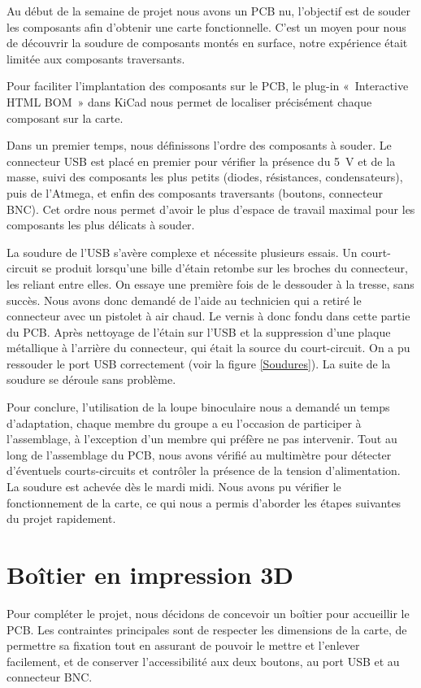 \documentclass[12pt, a4paper, titlepage]{article}
\begin{document}
Au début de la semaine de projet nous avons un PCB nu, l'objectif est de souder les composants afin d'obtenir une carte fonctionnelle. C'est un moyen pour nous de découvrir la soudure de composants montés en surface, notre expérience était limitée aux composants traversants.

 Pour faciliter l’implantation des composants sur le PCB, le plug-in  «~Interactive HTML BOM~»  dans KiCad nous permet de localiser précisément chaque composant sur la carte.

Dans un premier temps, nous définissons l’ordre des composants à souder. Le connecteur USB est placé en premier pour vérifier la présence du \SI{5}{\volt} et de la masse, suivi des composants les plus petits (diodes, résistances, condensateurs), puis de l’Atmega, et enfin des composants traversants (boutons, connecteur BNC). Cet ordre nous permet d'avoir le plus d'espace de travail maximal pour les composants les plus délicats à souder.

La soudure de l’USB s’avère complexe et nécessite plusieurs essais. Un court-circuit se produit lorsqu’une bille d’étain retombe sur les broches du connecteur, les reliant entre elles. On essaye une première fois de le dessouder à la tresse, sans succès. Nous avons donc demandé de l'aide au technicien qui a retiré le connecteur avec un pistolet à air chaud. Le vernis à donc fondu dans cette partie du PCB. Après nettoyage de l'étain sur l’USB et la suppression d’une plaque métallique à l’arrière du connecteur, qui était la source du court-circuit. On a pu ressouder le port USB correctement (voir la figure \ref{Soudures}). La suite de la soudure se déroule sans problème.

Pour conclure, l’utilisation de la loupe binoculaire nous a demandé un temps d’adaptation, chaque membre du groupe a eu l’occasion de participer à l’assemblage, à l’exception d’un membre qui préfère ne pas intervenir. Tout au long de l'assemblage du PCB, nous avons vérifié au multimètre pour détecter d’éventuels courts-circuits et contrôler la présence de la tension d’alimentation. La soudure est achevée dès le mardi midi. Nous avons pu vérifier le fonctionnement de la carte, ce qui nous a permis d’aborder les étapes suivantes du projet rapidement.

\section{Boîtier en impression 3D}

Pour compléter le projet, nous décidons de concevoir un boîtier pour accueillir le PCB. Les contraintes principales sont de respecter les dimensions de la carte, de permettre sa fixation tout en assurant de pouvoir le mettre et l'enlever facilement, et de conserver l’accessibilité aux deux boutons, au port USB et au connecteur BNC.
\end{document}
